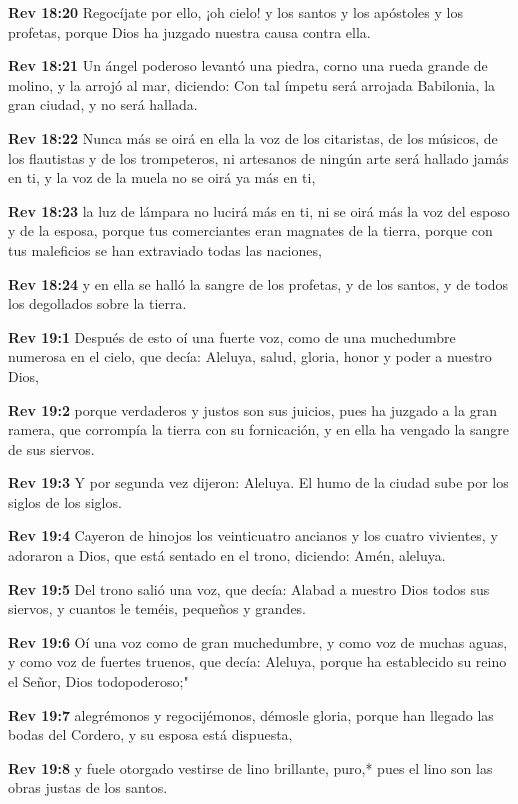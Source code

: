 \textbf{Rev 18:20} Regocíjate por ello, ¡oh cielo! y los santos y los apóstoles y los profetas, porque Dios ha juzgado nuestra causa contra ella. 

\textbf{Rev 18:21} Un ángel poderoso levantó una piedra, corno una rueda grande de molino, y la arrojó al mar, diciendo: Con tal ímpetu será arrojada Babilonia, la gran ciudad, y no será hallada. 

\textbf{Rev 18:22} Nunca más se oirá en ella la voz de los citaristas, de los músicos, de los flautistas y de los trompeteros, ni artesanos de ningún arte será hallado jamás en ti, y la voz de la muela no se oirá ya más en ti, 

\textbf{Rev 18:23} la luz de lámpara no lucirá más en ti, ni se oirá más la voz del esposo y de la esposa, porque tus comerciantes eran magnates de la tierra, porque con tus maleficios se han extraviado todas las naciones, 

\textbf{Rev 18:24} y en ella se halló la sangre de los profetas, y de los santos, y de todos los degollados sobre la tierra. 

\textbf{Rev 19:1} Después de esto oí una fuerte voz, como de una muchedumbre numerosa en el cielo, que decía: Aleluya, salud, gloria, honor y poder a nuestro Dios, 

\textbf{Rev 19:2} porque verdaderos y justos son sus juicios, pues ha juzgado a la gran ramera, que corrompía la tierra con su fornicación, y en ella ha vengado la sangre de sus siervos. 

\textbf{Rev 19:3} Y por segunda vez dijeron: Aleluya. El humo de la ciudad sube por los siglos de los siglos. 

\textbf{Rev 19:4} Cayeron de hinojos los veinticuatro ancianos y los cuatro vivientes, y adoraron a Dios, que está sentado en el trono, diciendo: Amén, aleluya. 

\textbf{Rev 19:5} Del trono salió una voz, que decía: Alabad a nuestro Dios todos sus siervos, y cuantos le teméis, pequeños y grandes. 

\textbf{Rev 19:6} Oí una voz como de gran muchedumbre, y como voz de muchas aguas, y como voz de fuertes truenos, que decía: Aleluya, porque ha establecido su reino el Señor, Dios todopoderoso;" 

\textbf{Rev 19:7} alegrémonos y regocijémonos, démosle gloria, porque han llegado las bodas del Cordero, y su esposa está dispuesta, 

\textbf{Rev 19:8} y fuele otorgado vestirse de lino brillante, puro,* pues el lino son las obras justas de los santos. 

